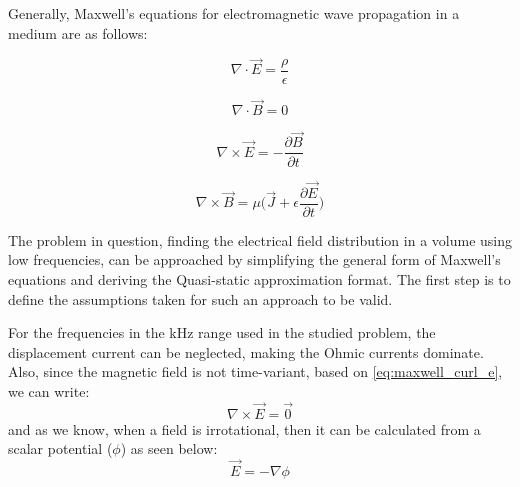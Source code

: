 Generally, Maxwell's equations for electromagnetic wave propagation in a medium are as follows:
\begin{center}
\begin{minipage}{.35\linewidth}
    \begin{equation}
        \nabla\cdot\vec{E}=\dfrac{\rho}{\epsilon}
    \end{equation}
\end{minipage}
\begin{minipage}{.35\linewidth}
    \begin{equation}
        \nabla\cdot\vec{B} = 0
    \end{equation}
\end{minipage}\break
\begin{minipage}{.35\linewidth}
    \begin{equation}
        \label{eq:maxwell_curl_e}
        \nabla\times\vec{E}=-\dfrac{\partial\vec{B}}{\partial t}
    \end{equation}
\end{minipage}
\begin{minipage}{.35\linewidth}
    \begin{equation}
        \nabla\times\vec{B} = \mu\Bigg(\vec{J} + \epsilon\dfrac{\partial\vec{E}}{\partial t}\Bigg)
    \end{equation}
\end{minipage}
\end{center}

\noindent The problem in question, finding the electrical field distribution in a volume using low frequencies, can be approached by simplifying the general form of Maxwell's equations and deriving the Quasi-static approximation format. The first step is to define the assumptions taken for such an approach to be valid.

For the frequencies in the \si{kHz} range used in the studied problem, the displacement current can be neglected, making the Ohmic currents dominate. Also, since the magnetic field is not time-variant, based on \autoref{eq:maxwell_curl_e}, we can write:
\begin{equation}
    \label{eq:curl_zero_e_field}
    \nabla\times\vec{E} = \vec{0}
\end{equation}
and as we know, when a field is irrotational, then it can be calculated from a scalar potential ($\phi$) as seen below:
\begin{equation}
    \label{eq:e_field_from_potential}
    \boxed{\vec{E} = -\nabla\phi}
\end{equation}

